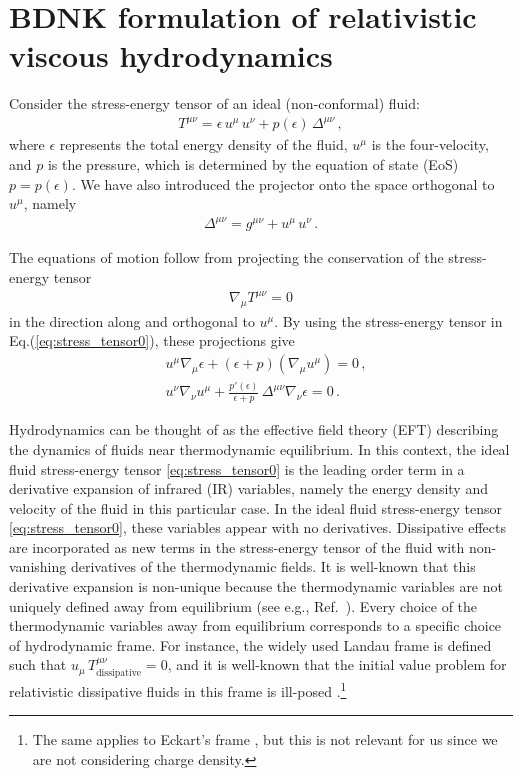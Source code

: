 \documentclass[prd,aps,twocolumn,floats,floatfix,nofootinbib,superscriptaddress] {revtex4-1}
\begin{document}
\section{BDNK formulation of relativistic viscous hydrodynamics}\label{section:BDNK_formulation}

Consider the stress-energy tensor of an ideal (non-conformal) fluid: 
\begin{align}
T^{\mu\nu} = \epsilon \,u^\mu\,u^\nu + p(\epsilon)\,\Delta^{\mu\nu}\,,
\label{eq:stress_tensor0}
\end{align}
where $\epsilon$ represents the total energy density of the fluid, $u^\mu$ is the four-velocity, and $p$ is the pressure, which is determined by the equation of state (EoS) $p=p(\epsilon)$.
We have also introduced the projector onto the space orthogonal to $u^\mu$, namely
\begin{align}
\Delta^{\mu\nu}=g^{\mu\nu}+u^\mu\,u^\nu\,.
\end{align}

The equations of motion follow from projecting the conservation of the stress-energy tensor
\begin{align}
\nabla_\mu T^{\mu\nu}=0 \label{eq:conservation}
\end{align}
in the direction along and orthogonal to $u^\mu$. By using the stress-energy tensor in Eq.(\ref{eq:stress_tensor0}), these projections give
\begin{align}
&u^\mu\nabla_\mu \epsilon+(\epsilon+p)(\nabla_\mu u^\mu)=0\,, \label{eq:ideal_eom_non_conformal1}\\
&u^\nu\nabla_\nu u^\mu+\frac{p'(\epsilon)}{\epsilon+p}\,\Delta^{\mu\nu}\nabla_\nu\epsilon=0\,. \label{eq:ideal_eom_non_conformal2}
\end{align}

Hydrodynamics can be thought of as the effective field theory (EFT) describing the dynamics of fluids near thermodynamic equilibrium. In this context, the ideal fluid stress-energy tensor \eqref{eq:stress_tensor0} is the leading order term in a derivative expansion of infrared (IR) variables,  namely the energy density and velocity of the fluid in this particular case. In the ideal fluid stress-energy tensor \eqref{eq:stress_tensor0}, these variables appear with no derivatives. Dissipative effects are incorporated as new terms in the stress-energy tensor of the fluid with non-vanishing derivatives of the thermodynamic fields. It is well-known that this derivative expansion is non-unique because the thermodynamic variables are not uniquely defined away from equilibrium (see e.g., Ref.~\cite{Kovtun:2019hdm}). Every choice of the thermodynamic variables away from equilibrium corresponds to a specific choice of hydrodynamic frame. For instance, the widely used Landau frame is defined such that $u_\mu\,T^{\mu\nu}_\text{dissipative}=0$, and it is well-known that the initial value problem for relativistic dissipative fluids in this frame is ill-posed \cite{Hiscock:1985zz}.\footnote{The same applies to Eckart's frame \cite{Eckart:1940te}, but this is not relevant for us since we are not considering charge density.}
\end{document}
